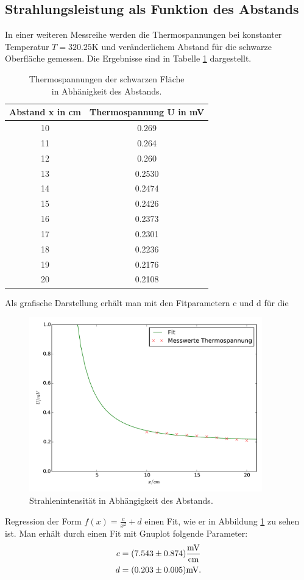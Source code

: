 \subsection{Strahlungsleistung als Funktion des Abstands}
In einer weiteren Messreihe werden die Thermospannungen bei konstanter Temperatur
$T=320.25\si{\kelvin}$ und veränderlichem Abstand für die schwarze Oberfläche
gemessen. Die Ergebnisse sind in Tabelle \ref{tab:thermospannung2} dargestellt.
\begin{table}
  \centering
  \begin{tabular}{c c}
    \toprule
    Abstand x in cm & Thermospannung U in \si{\milli\volt}\\
    \midrule
    10 & 0.269  \\
    11 & 0.264  \\
    12 & 0.260  \\
    13 & 0.2530 \\
    14 & 0.2474 \\
    15 & 0.2426 \\
    16 & 0.2373 \\
    17 & 0.2301 \\
    18 & 0.2236 \\
    19 & 0.2176 \\
    20 & 0.2108 \\
    \bottomrule
  \end{tabular}
 \caption{Thermospannungen der schwarzen Fläche\\in Abhänigkeit des Abstands.}
 \label{tab:thermospannung2}
\end{table}
\newpage
Als grafische Darstellung erhält man mit den Fitparametern c und d für die
\begin{figure}
  \centering
  \includegraphics[width=0.9\textwidth]{strahlintensitaet.pdf}
  \caption{Strahlenintensität in Abhängigkeit des Abstands.}
  \label{fig:strahlintensitaet}
\end{figure}
Regression der Form $f(x) = \frac{c}{x^2} + d $ einen Fit, wie er in Abbildung
\ref{fig:strahlintensitaet} zu sehen ist. Man erhält durch einen Fit mit Gnuplot
folgende Parameter:
\begin{align*}
  c &= (7.543\pm0.874) \si{\frac{\milli\volt}{\centi\meter}} \\
  d &= (0.203\pm0.005) \si{\milli\volt}.
\end{align*}
